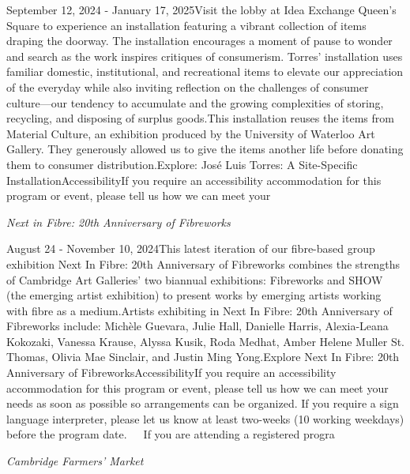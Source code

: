 \documentclass[letterpaper, 10pt]{article}
\newcommand{\subtitle}[1]{\textit{\large #1}\vspace{0.5em}}
\newcommand{\articlecontent}[1]{\small #1\vspace{1em}}
\begin{document}
\begin{multicols}{2}
{September 12, 2024 - January 17, 2025Visit the lobby at Idea Exchange Queen's Square to experience an installation featuring a vibrant collection of items draping the doorway. The installation encourages a moment of pause to wonder and search as the work inspires critiques of consumerism. Torres’ installation uses familiar domestic, institutional, and recreational items to elevate our appreciation of the everyday while also inviting reflection on the challenges of consumer culture—our tendency to accumulate and the growing complexities of storing, recycling, and disposing of surplus goods.This installation reuses the items from Material Culture, an exhibition produced by the University of Waterloo Art Gallery. They generously allowed us to give the items another life before donating them to consumer distribution.Explore: José Luis Torres: A Site-Specific InstallationAccessibilityIf you require an accessibility accommodation for this program or event, please tell us how we can meet your
}
\vspace{10px}

\subtitle{Next in Fibre: 20th Anniversary of Fibreworks}

\articlecontent{

\qrcode[height=1.5cm]{https://ideaexchange.libnet.info/event/11807111}
\vspace{10px}

August 24 - November 10, 2024This latest iteration of our fibre-based group exhibition Next In Fibre: 20th Anniversary of Fibreworks combines the strengths of Cambridge Art Galleries’ two biannual exhibitions: Fibreworks and SHOW (the emerging artist exhibition) to present works by emerging artists working with fibre as a medium.Artists exhibiting in Next In Fibre: 20th Anniversary of Fibreworks include: Michèle Guevara, Julie Hall, Danielle Harris, Alexia-Leana Kokozaki, Vanessa Krause, Alyssa Kusik, Roda Medhat, Amber Helene Muller St. Thomas, Olivia Mae Sinclair, and Justin Ming Yong.Explore Next In Fibre: 20th Anniversary of FibreworksAccessibilityIf you require an accessibility accommodation for this program or event, please tell us how we can meet your needs as soon as possible so arrangements can be organized. If you require a sign language interpreter, please let us know at least two-weeks (10 working weekdays) before the program date.   If you are attending a registered progra
}
\vspace{10px}

\subtitle{Cambridge Farmers' Market}

\articlecontent{

}
\end{multicols}
\end{document}
